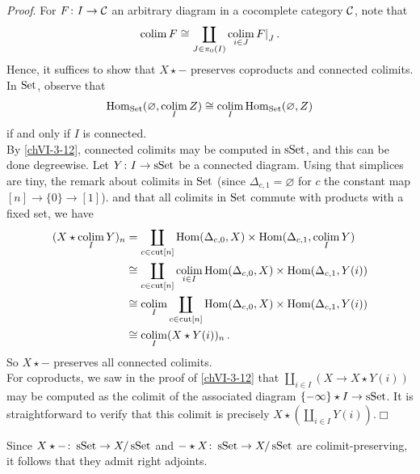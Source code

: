         \emph{Proof}. For $F \colon I \to \mathcal{C}$ an arbitrary diagram in a cocomplete category $\mathcal{C}$, note that
        \begin{equation*}
            \operatorname*{colim} F \cong \coprod\limits_{J \in \pi_0(I)} \operatorname*{colim}\limits_{i \in J} {F|}_{J} \,.
        \end{equation*}
        Hence, it suffices to show that $X \star -$ preserves coproducts and connected colimits.\\
        In $\operatorname{Set}$, observe that
        \begin{equation*}
            \operatorname{Hom}_{\operatorname{Set}}(\varnothing, \operatorname*{colim}\limits_{I} Z) \cong \operatorname*{colim}\limits_{I} \operatorname{Hom}_{\operatorname{Set}}(\varnothing, Z)
        \end{equation*}
        if and only if $I$ is connected.\\
        By \ref{chVI-3-12}, connected colimits may be computed in $\operatorname{sSet}$, and this can be done degreewise. Let $Y \colon I \to \operatorname{sSet}$ be a connected diagram. Using that simplices are tiny, the remark about colimits in $\operatorname{Set}$ (since $\Delta_{c,1} = \varnothing$ for $c$ the constant map $[n] \to \{0\} \to [1]$). and that all colimits in $\operatorname{Set}$ commute with products with a fixed set, we have
        \begin{align*}
            (X \star \operatorname*{colim}\limits_{I} Y)_n &= \coprod\limits_{c \in \operatorname{cut}[n]} \operatorname{Hom}(\Delta_{c,0}, X) \times \operatorname{Hom}(\Delta_{c,1}, \operatorname*{colim}\limits_{I} Y) \\
            &\cong \coprod\limits_{c \in \operatorname{cut}[n]} \operatorname*{colim}\limits_{i \in I} \operatorname{Hom}(\Delta_{c,0}, X) \times \operatorname{Hom}(\Delta_{c,1}, Y(i)) \\
            &\cong \operatorname*{colim}\limits_{I} \coprod\limits_{c \in \operatorname{cut}[n]} \operatorname{Hom}(\Delta_{c,0}, X) \times \operatorname{Hom}(\Delta_{c,1}, Y(i)) \\
            &\cong \operatorname*{colim}\limits_{I}(X \star Y(i))_n \,.
        \end{align*}
        So $X \star -$ preserves all connected colimits.\\
        For coproducts, we saw in the proof of \ref{chVI-3-12} that $\coprod\limits_{i \in I}(X \to X \star Y(i))$ may be computed as the colimit of the associated diagram $\{-\infty\} \star I \to \operatorname{sSet}$. It is straightforward to verify that this colimit is precisely $X \star (\coprod\limits_{i \in I} Y(i))$.\hfill$\Box$
        \medskip

        Since $X \star - \colon \operatorname{sSet} \to X/\operatorname{sSet}$ and $- \star X \colon \operatorname{sSet} \to X/\operatorname{sSet}$ are colimit-preserving, it follows that they admit right adjoints.

